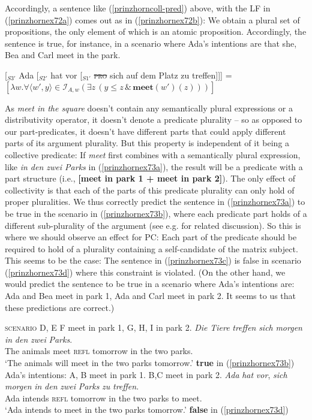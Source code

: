\documentclass[output=paper,colorlinks,citecolor=brown,
]{langscibook}
\begin{document}
Accordingly, a sentence like (\ref{prinzhorncoll-pred}) above, with the LF in (\ref{prinzhornex72a}) comes out as in (\ref{prinzhornex72b}): We obtain a plural set of propositions, the only element of which is an atomic proposition. Accordingly, the sentence is true, for instance, in a scenario where Ada's intentions are that she, Bea and Carl meet in the park.

\ea
\ea   \label{prinzhornex72a} [$_{S3'}$ Ada [$_{S2'}$ hat vor [$_{S1'}$ \sout{\textsc{pro}} sich auf dem Platz zu treffen]]]
\ex {} =  $[\lambda w.  \forall \langle w' ,y \rangle \in \mathcal{I}_{A,w} (\exists z \, (y \le z\, \& \,\textbf{meet}(w')(z)))]$\label{prinzhornex72b}
\z\z

As \textit{meet in the square} doesn't contain any semantically plural expressions or a distributivity operator, it doesn't denote a predicate plurality -- so as opposed to our part-predicates, it doesn't have different parts that could apply different parts of its argument plurality. But this property is independent of it being a collective predicate: If \textit{meet} first combines with a semantically plural expression,  like \textit{in den zwei Parks} in (\ref{prinzhornex73a}), the result will be a predicate with a part structure (i.e., \textbf{[meet in park 1 + meet in park 2]}). The only effect of collectivity is that each of the parts of this predicate plurality can only hold of proper pluralities. We  thus correctly predict the sentence in (\ref{prinzhornex73a}) to be true in the scenario in (\ref{prinzhornex73b}), where each predicate part holds of a different sub-plurality of the argument (see e.g. \citealt{Schwarzschild:1996} for related discussion). So this is where we should observe an effect for PC: Each part of the predicate should  be required to hold of a plurality containing a self-candidate of the matrix subject. This  seems to be the case: The sentence in (\ref{prinzhornex73c}) is false in scenario (\ref{prinzhornex73d}) where this constraint is violated. (On the other hand, we would predict the sentence to be true in a scenario where Ada's intentions are: Ada and Bea meet in park 1, Ada and Carl meet in park 2. It seems to us that these predictions are correct.)

\ea 
\ea \textsc{scenario}  D, E F meet in park 1, G, H, I in  park 2.  \label{prinzhornex73b}
\ex \gll \textit{Die} \textit{Tiere} \textit{treffen} \textit{sich} \textit{morgen} \textit{in} \textit{den} \textit{zwei} \textit{Parks}.\\
The animals meet \textsc{refl} tomorrow in the two parks.\\
\glt `The animals will meet in the two parks tomorrow.'  \phantom{.}\hfill \textbf{true} in (\ref{prinzhornex73b})\label{prinzhornex73a}
\ex Ada's intentions: A, B meet in park 1. B,C meet in park 2. \label{prinzhornex73d}
\ex \gll \textit{Ada} \textit{hat} \textit{vor}, \textit{sich} \textit{morgen} \textit{in} \textit{den} \textit{zwei} \textit{Parks} \textit{zu} \textit{treffen}.\\
Ada intends {} \textsc{refl} tomorrow in the two parks to meet.\\
\glt `Ada intends to meet in the two parks tomorrow.' \label{prinzhornex73c} \phantom{.}\hfill \textbf{false} in (\ref{prinzhornex73d})
\z\z
\end{document}

